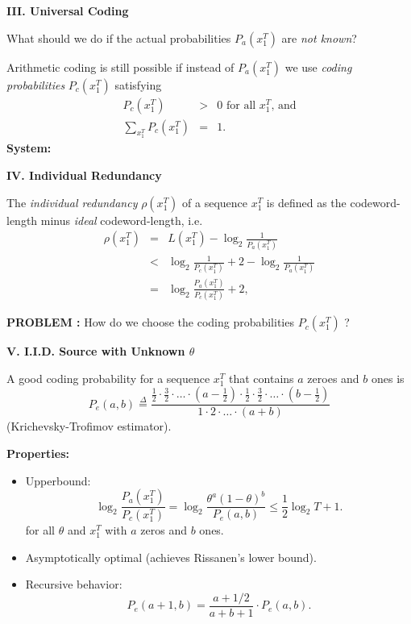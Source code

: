 \documentclass[a4paper,landscape]{slides} %
\newcommand{\define}{\stackrel{\Delta}{=}}
\newcommand{\xT}{x_{1}^{T}}
\begin{document}
\begin{slide}{\bf\Large\color{blue} III. Universal Coding}

What should we do if the actual probabilities $P_{a}(\xT)$ are {\em
not known}?

Arithmetic coding is still possible if instead of
$P_{a}(\xT)$ we use {\em coding probabilities} $P_{c}(\xT)$ satisfying
\begin{eqnarray}
P_{c}(\xT) &>&  0 \text{ for all $\xT$, and} \nonumber \\
\sum_{\xT} P_{c}(\xT) &= &1. \nonumber
\end{eqnarray}
{\bf System:}
\begin{center}

\end{center}
\end{slide}
\begin{slide}{\bf\Large\color{blue} IV. Individual Redundancy}

The {\em individual redundancy} $\rho(\xT)$ of a sequence $\xT$ is
defined as the codeword-length minus {\em ideal} codeword-length, i.e.
\begin{eqnarray*}
\rho(\xT)
&=& L(\xT) - \log_{2}\frac{1}{P_{a}(\xT)} \\
&< & \log_{2}\frac{1}{P_c(\xT)} +2 -\log_{2}\frac{1}{P_{a}(\xT)} \\
&=& \log_{2}\frac{P_a(\xT)}{P_c(\xT)} +2,
\end{eqnarray*}


{\bf PROBLEM :} How do we choose the coding probabilities $P_{c}(\xT)$ ?
\end{slide}
\begin{slide}{\bf\Large\color{blue} V. I.I.D. Source with Unknown $\theta$}

A good coding probability for a sequence $\xT$ that contains
$a$ zeroes and $b$ ones is
\[
P_{e}(a,b) \define \frac{ \frac12 \cdot \frac32 \cdot \hdots \cdot (a-\frac12) \cdot
                          \frac12 \cdot \frac32 \cdot \hdots \cdot (b-\frac12)  }{1 \cdot 2 \cdot \hdots \cdot (a+b)}
\]
(Krichevsky-Trofimov estimator).

{\bf Properties:}
\begin{itemize}
\item\vspace{-10mm}
Upperbound:
\[
\log_2 \frac{P_{a}(\xT)}{P_{c}(\xT)}
= \log_{2} \frac{\theta^{a}(1-\theta)^{b}}{P_e(a,b)} \leq \frac12 \log_{2} T + 1.
\]
for all $\theta$ and $\xT$ with $a$ zeros and $b$ ones.
\item
\vspace{-10mm}
Asymptotically optimal (achieves Rissanen's lower bound).
\item
\vspace{-10mm} Recursive behavior:
\[
P_{e}(a+1,b) = \frac{a+1/2}{a+b+1} \cdot P_{e}(a,b).
\]
\end{itemize}
\end{slide}
\end{document}
